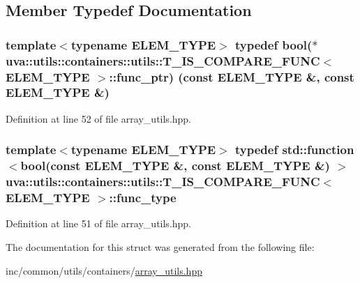 \subsection{Member Typedef Documentation}
\hypertarget{structuva_1_1utils_1_1containers_1_1utils_1_1_t___i_s___c_o_m_p_a_r_e___f_u_n_c_a61f5648bfc3504c58120f0fc85d50ff1}{}
\subsubsection[{func\+\_\+ptr}]{\setlength{\rightskip}{0pt plus 5cm}template$<$typename E\+L\+E\+M\+\_\+\+T\+Y\+P\+E$>$ typedef bool($\ast$  {\bf uva\+::utils\+::containers\+::utils\+::\+T\+\_\+\+I\+S\+\_\+\+C\+O\+M\+P\+A\+R\+E\+\_\+\+F\+U\+N\+C}$<$ E\+L\+E\+M\+\_\+\+T\+Y\+P\+E $>$\+::func\+\_\+ptr) (const E\+L\+E\+M\+\_\+\+T\+Y\+P\+E \&, const E\+L\+E\+M\+\_\+\+T\+Y\+P\+E \&)}\label{structuva_1_1utils_1_1containers_1_1utils_1_1_t___i_s___c_o_m_p_a_r_e___f_u_n_c_a61f5648bfc3504c58120f0fc85d50ff1}


Definition at line 52 of file array\+\_\+utils.\+hpp.

\hypertarget{structuva_1_1utils_1_1containers_1_1utils_1_1_t___i_s___c_o_m_p_a_r_e___f_u_n_c_a526315e110dfa5adeb3547cb4c74bfef}{}
\subsubsection[{func\+\_\+type}]{\setlength{\rightskip}{0pt plus 5cm}template$<$typename E\+L\+E\+M\+\_\+\+T\+Y\+P\+E$>$ typedef std\+::function$<$bool(const E\+L\+E\+M\+\_\+\+T\+Y\+P\+E \&, const E\+L\+E\+M\+\_\+\+T\+Y\+P\+E \&) $>$ {\bf uva\+::utils\+::containers\+::utils\+::\+T\+\_\+\+I\+S\+\_\+\+C\+O\+M\+P\+A\+R\+E\+\_\+\+F\+U\+N\+C}$<$ E\+L\+E\+M\+\_\+\+T\+Y\+P\+E $>$\+::{\bf func\+\_\+type}}\label{structuva_1_1utils_1_1containers_1_1utils_1_1_t___i_s___c_o_m_p_a_r_e___f_u_n_c_a526315e110dfa5adeb3547cb4c74bfef}


Definition at line 51 of file array\+\_\+utils.\+hpp.



The documentation for this struct was generated from the following file\+:\begin{DoxyCompactItemize}
\item 
inc/common/utils/containers/\hyperlink{array__utils_8hpp}{array\+\_\+utils.\+hpp}\end{DoxyCompactItemize}
